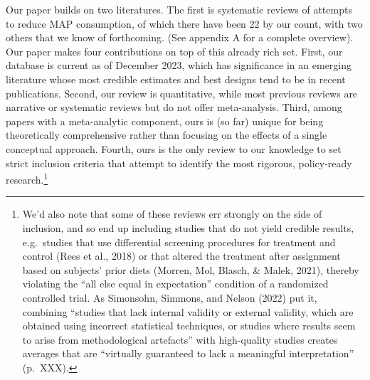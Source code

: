 \documentclass[
  man]{apa6}
\begin{document}
Our paper builds on two literatures. The first is systematic reviews of attempts to reduce MAP consumption, of which there have been 22 by our count, with two others that we know of forthcoming. (See appendix A for a complete overview). Our paper makes four contributions on top of this already rich set. First, our database is current as of December 2023, which has significance in an emerging literature whose most credible estimates and best designs tend to be in recent publications. Second, our review is quantitative, while most previous reviews are narrative or systematic reviews but do not offer meta-analysis. Third, among papers with a meta-analytic component, ours is (so far) unique for being theoretically comprehensive rather than focusing on the effects of a single conceptual approach. Fourth, ours is the only review to our knowledge to set strict inclusion criteria that attempt to identify the most rigorous, policy-ready research.\footnote{We'd also note that some of these reviews err strongly on the side of inclusion, and so end up including studies that do not yield credible results, e.g.~studies that use differential screening procedures for treatment and control (Rees et al., 2018) or that altered the treatment after assignment based on subjects' prior diets (Morren, Mol, Blasch, \& Malek, 2021), thereby violating the ``all else equal in expectation'' condition of a randomized controlled trial. As Simonsohn, Simmons, and Nelson (2022) put it, combining ``studies that lack internal validity or external validity, which are obtained using incorrect statistical techniques, or studies where results seem to arise from methodological artefacts'' with high-quality studies creates averages that are ``virtually guaranteed to lack a meaningful interpretation'' (p.~XXX).}
\end{document}
